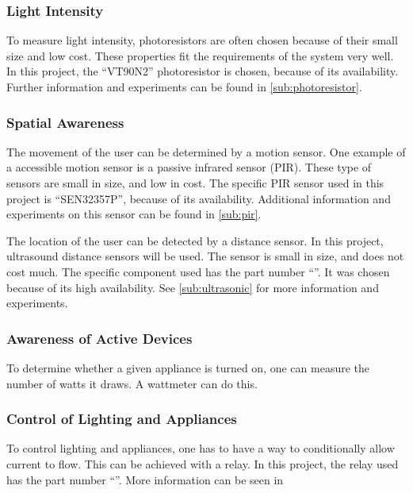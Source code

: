 \subsubsection{Light Intensity}
To measure light intensity, photoresistors are often chosen because of their small size and low cost. These properties fit the requirements of the system very well. In this project, the \enquote{VT90N2} photoresistor is chosen, because of its availability. Further information and experiments can be found in \cref{sub:photoresistor}.

\subsubsection{Spatial Awareness}
The movement of the user can be determined by a motion sensor. One example of a accessible motion sensor is a passive infrared sensor (PIR). These type of sensors are small in size, and low in cost. The specific PIR sensor used in this project is \enquote{SEN32357P}, because of its availability. Additional information and experiments on this sensor can be found in \cref{sub:pir}.

The location of the user can be detected by a distance sensor. In this project, ultrasound distance sensors will be used. The sensor is small in size, and does not cost much. The specific component used has the part number \enquote{}. It was chosen because of its high availability. See \cref{sub:ultrasonic} for more information and experiments.

\subsubsection{Awareness of Active Devices}
To determine whether a given appliance is turned on, one can measure the number of watts it draws. A wattmeter can do this.

\subsubsection{Control of Lighting and Appliances}
To control lighting and appliances, one has to have a way to conditionally allow current to flow. This can be achieved with a relay. In this project, the relay used has the part number \enquote{}. More information can be seen in %

